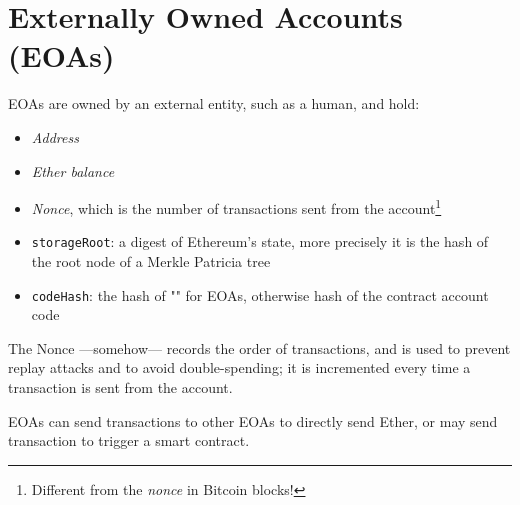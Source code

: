 \section{Externally Owned Accounts (EOAs)}
EOAs are owned by an external entity, such as a human, and hold:
\begin{itemize}
   \item \textit{Address}
   \item \textit{Ether balance}
   \item \textit{Nonce}, which is the number of transactions sent from the account\footnote{Different from the \textit{nonce} in Bitcoin blocks!}
   \item \texttt{storageRoot}: a digest of Ethereum's state, more precisely it is the hash of the root node of a Merkle Patricia tree
   \item \texttt{codeHash}: the hash of "" for EOAs, otherwise hash of the contract account code
\end{itemize}
The Nonce ---somehow--- records the order of transactions, and is used to prevent replay attacks and to avoid double-spending; it is incremented every time a transaction is sent from the account.


EOAs can send transactions to other EOAs to directly send Ether, or may send transaction to trigger a smart contract.

